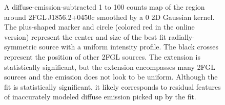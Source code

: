 \documentclass[12pt,preprint]{aastex}
\newif\ifcolorfigure
\newcommand{\gev}{\text{GeV}\xspace}
\begin{document}
\clearpage
\begin{figure}
    \ifcolorfigure
    \plotone{source_plots/example_bad_fit_color.eps}
    \else
    \fi
    \caption{
    A diffuse-emission-subtracted 1 \gev to 100 \gev counts map of the
    region around 2FGL\,J1856.2+0450c smoothed by a 0 2D Gaussian
    kernel. The plus-shaped marker and circle (colored red in
    the online version) represent the center and size of the best fit
    radially-symmetric source with a uniform intensity profile.  The black
    crosses represent the position of other 2FGL sources.  The extension
    is statistically significant, but the extension encompasses many 2FGL
    sources and the emission does not look to be uniform. Although
    the fit is statistically significant, it likely corresponds to
    residual features of inaccurately modeled diffuse emission picked
    up by the fit. 
    }
    \label{example_bad_fit}
\end{figure}
\end{document}
